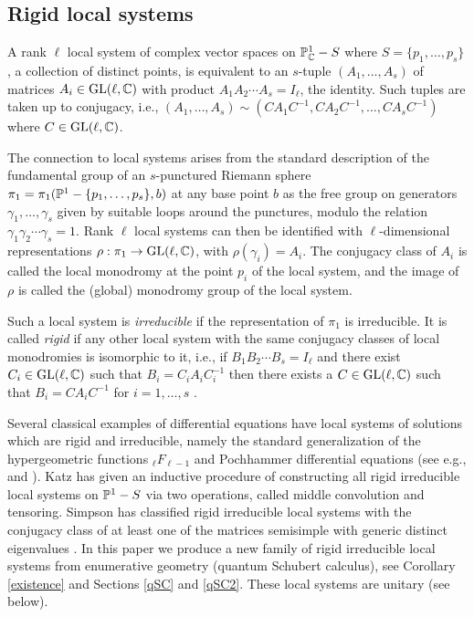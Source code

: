 \documentclass[11pt]{amsart}
\newcommand\op{\operatorname}
\numberwithin{theorem}{subsection}
\begin{document}
\subsection{Rigid local systems}
A rank $\ell$ local system of complex vector spaces on $\Bbb{P}^1_{\Bbb{C}}-S$ where $S=\{p_1,\dots,p_s\}$, a collection of distinct points,  is equivalent to an $s$-tuple $(A_1,\dots,A_s)$ of matrices $A_i\in \op{GL}(\ell,\Bbb{C})$ with product $A_1A_2\cdots A_s= I_{\ell}$, the identity. Such tuples are taken up to conjugacy, i.e.,  $(A_1,\dots,A_s)\sim (CA_1C^{-1}, CA_2C^{-1},\dots, CA_sC^{-1})$ where $C\in  \op{GL}(\ell,\Bbb{C})$.

The connection to local systems arises from the standard description of the fundamental group of an $s$-punctured Riemann sphere $\pi_1=\pi_1(\Bbb{P}^1-\{p_1,\dots,p_s\},b)$ at any base point $b$ as the free group on generators $\gamma_{1},\dots,\gamma_{s}$ given by suitable loops around the punctures, modulo the relation $\gamma_{1}\gamma_{2}\cdots\gamma_s=1$.  Rank $\ell$ local systems can then be identified with $\ell$-dimensional representations $\rho:\pi_1\to \op{GL}(\ell,\Bbb{C})$, with $\rho(\gamma_i)=A_i$. The conjugacy class of $A_i$ is
called the local monodromy at the point $p_i$ of the local system, and the image of $\rho$ is called  the (global) monodromy group of the local system.

Such a local system is {\em irreducible} if the representation of $\pi_1$ is irreducible. It is called {\em rigid} if any other local system with the same conjugacy classes of  local monodromies is isomorphic to it, i.e., if
$B_1B_2\cdots B_s=I_{\ell}$ and there exist $C_i\in \op{GL}(\ell,\Bbb{C})$ such that $B_i=C_iA_iC_i^{-1}$ then there exists a $C\in \op{GL}(\ell,\Bbb{C})$ such that $B_i=CA_iC^{-1}$ for $i=1,\dots,s$ \cite{Katz}.

Several classical examples of differential equations have local systems of solutions which are rigid and irreducible, namely the standard generalization of the hypergeometric functions  ${}_{\ell}F_{\ell-1}$ and Pochhammer differential equations (see e.g., \cite{BH} and \cite{Haraoka}).  Katz  \cite{Katz} has given an inductive procedure of constructing all  rigid irreducible local systems on  $\Bbb{P}^1-S$ via two operations, called middle convolution and tensoring. Simpson has classified rigid irreducible local systems with the conjugacy class of at least one of the matrices semisimple with generic distinct eigenvalues \cite{SimOld}. In this paper we produce a new family of rigid irreducible local systems from enumerative geometry (quantum Schubert calculus), see Corollary \ref{existence} and Sections \ref{qSC} and \ref{qSC2}. These local systems are unitary (see below).
\end{document}
